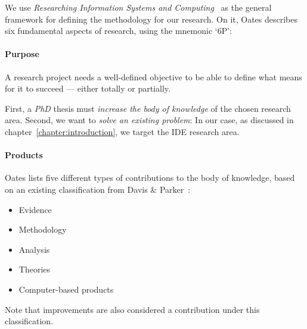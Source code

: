 We use \emph{Researching Information Systems and Computing}~\cite{Oates2006} as the
general framework for defining the methodology for our research. On it, Oates describes
six fundamental aspects of research, using the mnemonic `6P':


\paragraph{Purpose}
\label{method:purpose}
A research project needs a well-defined objective to be able
to define what means for it to succeed --- either totally or partially.

First, a \emph{PhD} thesis must \emph{increase the body of knowledge}
of the chosen research area. Second, we want to \emph{solve an existing problem}:
In our case, as discussed in chapter~\ref{chapter:introduction}, we target the
\gls{IDE} research area.

\paragraph{Products}
\label{method:products}
Oates lists five different types of contributions to the body of knowledge, based on
an existing classification from Davis \& Parker~\cite{Oates2006,Davis1997}:

\begin{itemize}
    \item Evidence
    \item Methodology
    \item Analysis
    \item Theories
    \item Computer-based products
\end{itemize}

Note that improvements are also considered a contribution under this classification.

